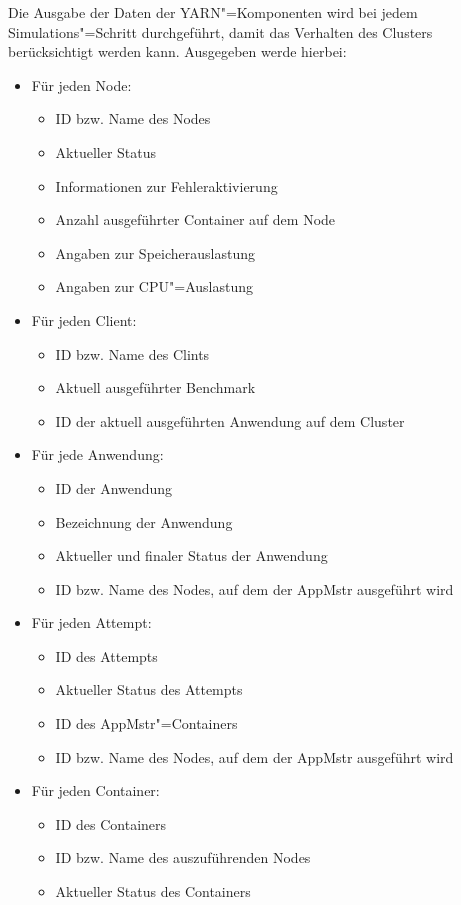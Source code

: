 Die Ausgabe der Daten der YARN"=Komponenten wird bei jedem Simulations"=Schritt durchgeführt, damit das Verhalten des Clusters berücksichtigt werden kann.
Ausgegeben werde hierbei:

\begin{itemize}
    \item Für jeden Node:
    \begin{itemize}
        \item ID bzw. Name des Nodes
        \item Aktueller Status
        \item Informationen zur Fehleraktivierung
        \item Anzahl ausgeführter Container auf dem Node
        \item Angaben zur Speicherauslastung
        \item Angaben zur CPU"=Auslastung
    \end{itemize}
    
    \item Für jeden Client:
    \begin{itemize}
        \item ID bzw. Name des Clints
        \item Aktuell ausgeführter Benchmark
        \item ID der aktuell ausgeführten Anwendung auf dem Cluster
    \end{itemize}

    \item Für jede Anwendung:
    \begin{itemize}
        \item ID der Anwendung
        \item Bezeichnung der Anwendung
        \item Aktueller und finaler Status der Anwendung
        \item ID bzw. Name des Nodes, auf dem der \ac{AppMstr} ausgeführt wird
    \end{itemize}

    \item Für jeden Attempt:
    \begin{itemize}
        \item ID des Attempts
        \item Aktueller Status des Attempts
        \item ID des \ac{AppMstr}"=Containers
        \item ID bzw. Name des Nodes, auf dem der \ac{AppMstr} ausgeführt wird
    \end{itemize}

    \item Für jeden Container:
    \begin{itemize}
        \item ID des Containers
        \item ID bzw. Name des auszuführenden Nodes
        \item Aktueller Status des Containers
    \end{itemize}
\end{itemize}

